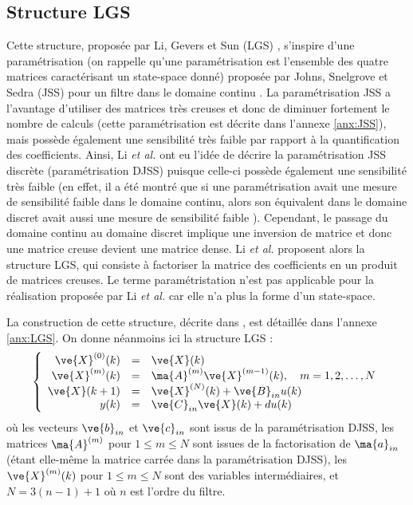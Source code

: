 

\subsection{Structure LGS}

Cette structure, proposée par Li, Gevers et Sun (LGS) \cite{LGS00}, s'inspire d'une paramétrisation (on rappelle qu'une paramétrisation est l'ensemble des quatre matrices caractérisant un state-space donné) proposée par Johns, Snelgrove et Sedra (JSS) pour un filtre dans le domaine continu \cite{JSS89}. La paramétrisation JSS a l'avantage d'utiliser des matrices très creuses et donc de diminuer fortement le nombre de calculs (cette paramétrisation est décrite dans l'annexe \ref{anx:JSS}), mais possède également une sensibilité très faible par rapport à la quantification des coefficients. Ainsi, Li \emph{et al.} ont eu l'idée de décrire la paramétrisation JSS discrète (paramétrisation DJSS) puisque celle-ci possède également une sensibilité très faible (en effet, il a été montré que si une paramétrisation avait une mesure de sensibilité faible dans le domaine continu, alors son équivalent dans le domaine discret avait aussi une mesure de sensibilité faible \cite{LuHa88}). Cependant, le passage du domaine continu au domaine discret implique une inversion de matrice et donc une matrice creuse devient une matrice dense. Li \emph{et al.} proposent alors la structure LGS, qui consiste à factoriser la matrice des coefficients en un produit de matrices creuses. Le terme paramétristation n'est pas applicable pour la réalisation proposée par Li \emph{et al.} car elle n'a plus la forme d'un state-space. 

La construction de cette structure, décrite dans \cite{LGS00}, est détaillée dans l'annexe \ref{anx:LGS}. On donne néanmoins ici la structure LGS :
\begin{equation*}
\left \{
\begin{array}{rcl}
\ve{X}^{(0)}(k)&=&\ve{X}(k)\\
\ve{X}^{(m)}(k) & = & \ma{A}^{(m)}\ve{X}^{(m-1)}(k), \quad m=1,2,\ldots,N\\
\ve{X}(k+1) & = & \ve{X}^{(N)}(k)+\ve{B}_{in}u(k) \\
y(k)& = & \ve{C}_{in}\ve{X}(k)+du(k)\\
\end{array}
\right .
\end{equation*}
où les vecteurs $\ve{b}_{in}$ et $\ve{c}_{in}$ sont issus de la paramétrisation DJSS, les matrices $\ma{A}^{(m)}$ pour $1\leq m \leq N$ sont issues de la factorisation de $\ma{a}_{in}$ (étant elle-même la matrice carrée dans la paramétrisation DJSS), les $\ve{X}^{(m)}(k)$  pour $1\leq m \leq N$ sont des variables intermédiaires, et $N = 3(n-1)+1$ où $n$ est l'ordre du filtre.



